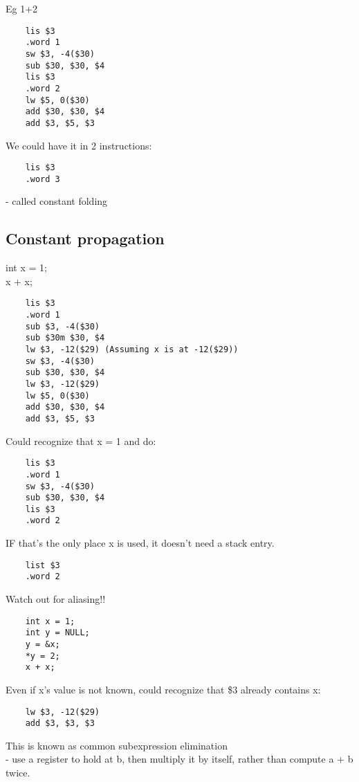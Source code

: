 \documentclass[12pt]{article}
\begin{document}
	Eg 1+2\\
	\begin{verbatim}
	lis $3
	.word 1
	sw $3, -4($30)
	sub $30, $30, $4
	lis $3
	.word 2
	lw $5, 0($30)
	add $30, $30, $4
	add $3, $5, $3
	\end{verbatim}
	
	We could have it in 2 instructions:\\
	\begin{verbatim}
	lis $3
	.word 3
	\end{verbatim}
	- called constant folding
	
	\subsection*{Constant propagation}
	int x = 1;\\
	x + x;\\
	\begin{verbatim}
	lis $3
	.word 1
	sub $3, -4($30)
	sub $30m $30, $4
	lw $3, -12($29) (Assuming x is at -12($29))
	sw $3, -4($30)
	sub $30, $30, $4
	lw $3, -12($29)
	lw $5, 0($30)
	add $30, $30, $4
	add $3, $5, $3
	\end{verbatim}
	
	Could recognize that x = 1 and do:\\
	\begin{verbatim}
	lis $3
	.word 1
	sw $3, -4($30)
	sub $30, $30, $4
	lis $3
	.word 2
	\end{verbatim}
	
	IF that's the only place x is used, it doesn't need a stack entry. 
	\begin{verbatim}
	list $3
	.word 2
	\end{verbatim}
	
	Watch out for aliasing!!\\
	
	\begin{verbatim}
	int x = 1;
	int y = NULL;
	y = &x;
	*y = 2;
	x + x;
	\end{verbatim}
	
	Even if x's value is not known, could recognize that \$3 already contains x:\\
	\begin{verbatim}
	lw $3, -12($29)
	add $3, $3, $3
	\end{verbatim}
	This is known as common subexpression elimination\\
	- use a register to hold at b, then multiply it by itself, rather than compute a + b twice.\\
	
\end{document}
